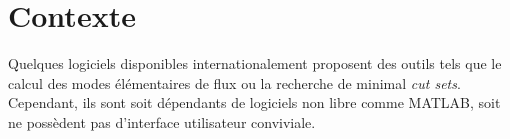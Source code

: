 \chapter{Contexte}

Quelques logiciels disponibles internationalement proposent des outils tels que le calcul des modes élémentaires de flux ou la recherche de minimal \textit{cut sets}. Cependant, ils sont soit dépendants de logiciels non libre comme MATLAB, soit ne possèdent pas d'interface utilisateur conviviale.\\
